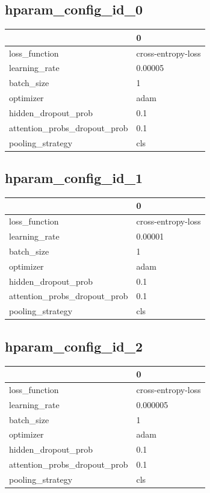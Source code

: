 \documentclass{article}
\begin{document}
\subsection{hparam\_config\_id\_0}
\begin{tabular}{ll}
\toprule
{} &                   0 \\
\midrule
loss\_function                &  cross-entropy-loss \\
learning\_rate                &             0.00005 \\
batch\_size                   &                   1 \\
optimizer                    &                adam \\
hidden\_dropout\_prob          &                 0.1 \\
attention\_probs\_dropout\_prob &                 0.1 \\
pooling\_strategy             &                 cls \\
\bottomrule
\end{tabular}

\subsection{hparam\_config\_id\_1}
\begin{tabular}{ll}
\toprule
{} &                   0 \\
\midrule
loss\_function                &  cross-entropy-loss \\
learning\_rate                &             0.00001 \\
batch\_size                   &                   1 \\
optimizer                    &                adam \\
hidden\_dropout\_prob          &                 0.1 \\
attention\_probs\_dropout\_prob &                 0.1 \\
pooling\_strategy             &                 cls \\
\bottomrule
\end{tabular}

\subsection{hparam\_config\_id\_2}
\begin{tabular}{ll}
\toprule
{} &                   0 \\
\midrule
loss\_function                &  cross-entropy-loss \\
learning\_rate                &            0.000005 \\
batch\_size                   &                   1 \\
optimizer                    &                adam \\
hidden\_dropout\_prob          &                 0.1 \\
attention\_probs\_dropout\_prob &                 0.1 \\
pooling\_strategy             &                 cls \\
\bottomrule
\end{tabular}
\end{document}
